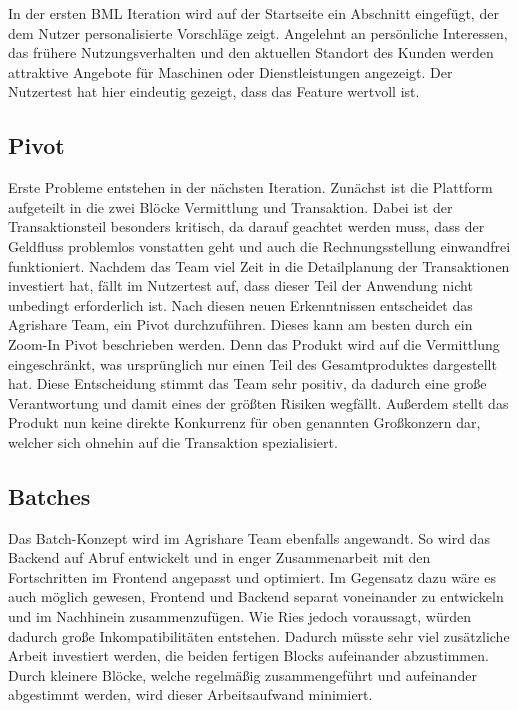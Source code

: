 In der ersten \ac{BML} Iteration wird auf der Startseite ein Abschnitt eingefügt, der dem Nutzer personalisierte Vorschläge zeigt. Angelehnt an persönliche Interessen, das frühere Nutzungsverhalten und den aktuellen Standort des Kunden werden attraktive Angebote für Maschinen oder Dienstleistungen angezeigt. Der Nutzertest hat hier eindeutig gezeigt, dass das Feature wertvoll ist. 

\subsection*{\label{sec:LeanStartup-Umsetzung-Pivot}\thesubsection\quad Pivot}Erste Probleme entstehen in der nächsten Iteration. Zunächst ist die Plattform aufgeteilt in die zwei Blöcke Vermittlung und Transaktion. Dabei ist der Transaktionsteil besonders kritisch, da darauf geachtet werden muss, dass der Geldfluss problemlos vonstatten geht und auch die Rechnungsstellung einwandfrei funktioniert. Nachdem das Team viel Zeit in die Detailplanung der Transaktionen investiert hat, fällt im Nutzertest auf, dass dieser Teil der Anwendung nicht unbedingt erforderlich ist. Nach diesen neuen Erkenntnissen entscheidet das Agrishare Team, ein Pivot durchzuführen. Dieses kann am besten durch ein Zoom-In Pivot beschrieben werden. Denn das Produkt wird auf die Vermittlung eingeschränkt, was ursprünglich nur einen Teil des Gesamtproduktes dargestellt hat. Diese Entscheidung stimmt das Team sehr positiv, da dadurch eine große Verantwortung und damit eines der größten Risiken wegfällt. Außerdem stellt das Produkt nun keine direkte Konkurrenz für oben genannten Großkonzern dar, welcher sich ohnehin auf die Transaktion spezialisiert.

\subsection*{\label{sec:LeanStartup-Umsetzung-Batches}\thesubsection\quad Batches}Das Batch-Konzept wird im Agrishare Team ebenfalls angewandt. So wird das Backend auf Abruf entwickelt und in enger Zusammenarbeit mit den Fortschritten im Frontend angepasst und optimiert. Im Gegensatz dazu wäre es auch möglich gewesen, Frontend und Backend separat voneinander zu entwickeln und im Nachhinein zusammenzufügen. Wie Ries jedoch voraussagt, würden dadurch große Inkompatibilitäten entstehen. Dadurch müsste sehr viel zusätzliche Arbeit investiert werden, die beiden fertigen Blocks aufeinander abzustimmen. Durch kleinere Blöcke, welche regelmäßig zusammengeführt und aufeinander abgestimmt werden, wird dieser Arbeitsaufwand minimiert.


